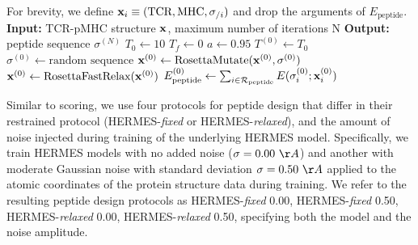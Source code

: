 \begin{itemize}
{
\begin{algorithm}[H]
{For brevity, we define ${\bf x}_i \equiv (\text{TCR}, \text{MHC}, \sigma_{/i})$ and drop the arguments
of $E_{\text{peptide}}$.}
\label{alg:hermes_relaxed_design}
\textbf{Input:} TCR-pMHC structure ${\bf x}$, maximum number of iterations N\;
\textbf{Output:} peptide sequence $\sigma^{(N)}$\;
$T_0 \gets 10$\;
$T_f \gets 0$\;
$a \gets 0.95$\;
$T^{(0)} \gets T_0$\;
$\sigma^{(0)} \gets \text{random sequence}$\;
${\bf x}^{(0)} \gets \text{RosettaMutate}({\bf x}^{(0)}, \sigma^{(0)})$\;
${\bf x}^{(0)} \gets \text{RosettaFastRelax}({\bf x}^{(0)})$\;
$E^{(0)}_{\text{peptide}} \gets \sum_{i \in \mathcal{R}_{\text{peptide}}} E(\sigma^{(0)}_i ; {\bf
x}^{(0)}_i)$\;
\end{algorithm}
}
\vspace{1cm}
\end{itemize}


\noindent Similar to scoring, we use four protocols for peptide design that differ in their
restrained protocol (HERMES-{\em fixed} or HERMES-{\em relaxed}), and the amount of noise injected
during training of the underlying HERMES model. Specifically, we train HERMES models with no added
noise ($\sigma =0.00~\AA$) and another with moderate Gaussian noise with standard deviation $\sigma=
0.50~\AA$ applied to the atomic coordinates of the protein structure data during training. We refer
to the resulting peptide design protocols as HERMES-{\em fixed} 0.00, HERMES-{\em fixed} 0.50,
HERMES-{\em relaxed} 0.00, HERMES-{\em relaxed} 0.50, specifying both the model and the noise
amplitude.\\





